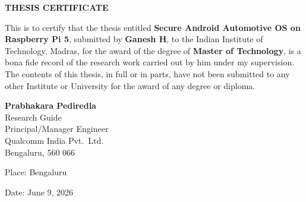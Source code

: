 \newpage
\thispagestyle{empty}
\begin{center}
    \vspace*{2cm}
    {\large \textbf{THESIS CERTIFICATE}}
\end{center}

\vspace{2cm}

\noindent This is to certify that the thesis entitled \textbf{Secure Android Automotive OS on Raspberry Pi 5}, submitted by \textbf{Ganesh H}, to the Indian Institute of Technology, Madras, for the award of the degree of \textbf{Master of Technology}, is a bona fide record of the research work carried out by him under my supervision. The contents of this thesis, in full or in parts, have not been submitted to any other Institute or University for the award of any degree or diploma.

\vspace{5cm}

\noindent \textbf{Prabhakara Pediredla}\\
Research Guide\\
Principal/Manager Engineer\\
Qualcomm India Pvt.\ Ltd.\\
Bengaluru, 560 066

\vspace{1.5cm}

\noindent Place: Bengaluru

\vspace{0.5cm}

\noindent Date: June 9, 2026
